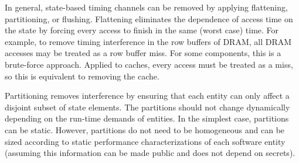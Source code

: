 In general, state-based timing channels can be removed by applying 
flattening, partitioning, or flushing.
Flattening eliminates the dependence of access time on the state by forcing 
every access to finish in the same (worst case) time. For example, to remove 
timing interference in the row buffers of DRAM, all DRAM accesses may be 
treated as a row buffer miss.
For some components, this is a brute-force approach. Applied to caches, every 
access must be treated as a miss, so this is equivalent to removing the cache. 

Partitioning removes interference by ensuring that each entity can
only affect a disjoint subset of state elements. The partitions
should not change dynamically depending on the run-time demands of entities.
In the simplest case, partitions can be static.
However, partitions do not need to be homogeneous and can be sized according to 
static performance characterizations of each software entity (assuming this 
information can be made public and does not depend on secrets).


